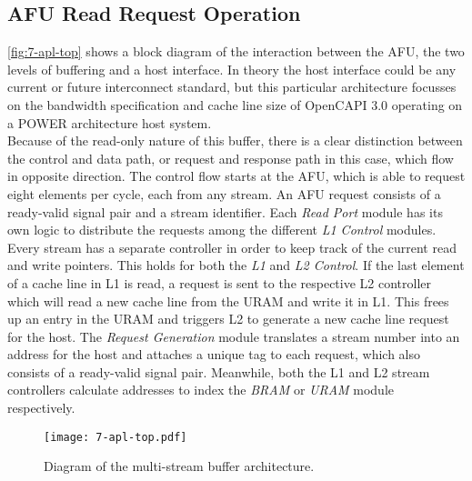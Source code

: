 \subsection{AFU Read Request Operation}
\autoref{fig:7-apl-top} shows a block diagram of the interaction between the AFU, the two levels of buffering and a host interface. In theory the host interface could be any current or future interconnect standard, but this particular architecture focusses on the bandwidth specification and cache line size of OpenCAPI 3.0 operating on a POWER architecture host system.\\
Because of the read-only nature of this buffer, there is a clear distinction between the control and data path, or request and response path in this case, which flow in opposite direction. The control flow starts at the AFU, which is able to request eight elements per cycle, each from any stream. An AFU request consists of a ready-valid signal pair and a stream identifier. Each \textit{Read Port} module has its own logic to distribute the requests among the different \textit{L1 Control} modules. Every stream has a separate controller in order to keep track of the current read and write pointers. This holds for both the \textit{L1} and \textit{L2 Control}. If the last element of a cache line in L1 is read, a request is sent to the respective L2 controller which will read a new cache line from the URAM and write it in L1. This frees up an entry in the URAM and triggers L2 to generate a new cache line request for the host. The \textit{Request Generation} module translates a stream number into an address for the host and attaches a unique tag to each request, which also consists of a ready-valid signal pair. Meanwhile, both the L1 and L2 stream controllers calculate addresses to index the \textit{BRAM} or \textit{URAM} module respectively.

\begin{figure}[H]
  \centering
  \texttt{[image: 7-apl-top.pdf]}
  \caption{Diagram of the multi-stream buffer architecture.}
  \label{fig:7-apl-top}
\end{figure}




